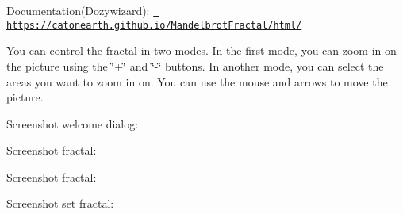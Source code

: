 Documentation(\+Dozywizard)\+: \href{https://catonearth.github.io/MandelbrotFractal/html/}{\texttt{ https\+://catonearth.\+github.\+io/\+Mandelbrot\+Fractal/html/}}

You can control the fractal in two modes. In the first mode, you can zoom in on the picture using the \char`\"{}+\char`\"{} and \char`\"{}-\/\char`\"{} buttons. In another mode, you can select the areas you want to zoom in on. You can use the mouse and arrows to move the picture. 

Screenshot welcome dialog\+: ~\newline
 

 

Screenshot fractal\+: ~\newline
 

 

Screenshot fractal\+: ~\newline
 

 

Screenshot set fractal\+: ~\newline
 

 